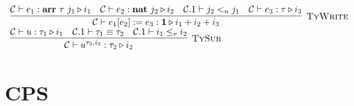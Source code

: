 \documentclass[fleqn]{article}
\begin{document}
\[\begin{array}{l}
    \infer[\textsc{TyWrite}]{\mathcal{C} \vdash e_1[e_2] := e_3 : \mathbf{1} \triangleright i_1 + i_2 + i_3}{\mathcal{C} \vdash e_1 : \mathbf{arr}~\tau~j_1 \triangleright i_1 & \mathcal{C} \vdash e_2 : \mathbf{nat}~j_2 \triangleright i_2 & \mathcal{C}.1 \vdash j_2 <_n j_1 & \mathcal{C} \vdash e_3 : \tau \triangleright i_3} \\
    \infer[\textsc{TySub}]{\mathcal{C} \vdash u^{\tau_2,i_2} : \tau_2 \triangleright i_2}{\mathcal{C} \vdash u : \tau_1 \triangleright i_1 & \mathcal{C}.1 \vdash \tau_1 \equiv \tau_2 & \mathcal{C}.1 \vdash i_1 \le_r i_2}
\end{array}
\]
\section{CPS}

\newcommand{\cpsc}[1]{\mathfrak{K}_{\mathrm{cstr}}\llbracket #1 \rrbracket}
\newcommand{\cpst}[2]{\mathfrak{K}_{\mathrm{term}}\llbracket #1 \rrbracket ( #2 )}
\end{document}
